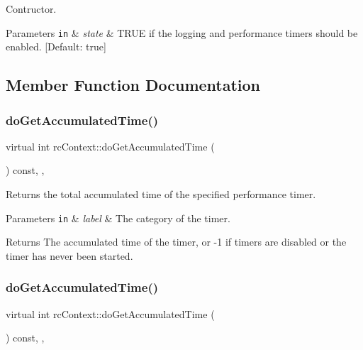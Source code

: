 Contructor. 
\begin{DoxyParams}[1]{Parameters}
\mbox{\tt in}  & {\em state} & T\+R\+UE if the logging and performance timers should be enabled. \mbox{[}Default\+: true\mbox{]} \\
\hline
\end{DoxyParams}


\subsection{Member Function Documentation}
\mbox{\label{classrcContext_aac5af865c567bd0e362cb6a98c65c860}} 
\subsubsection{\texorpdfstring{do\+Get\+Accumulated\+Time()}{doGetAccumulatedTime()}\hspace{0.1cm}{\footnotesize\ttfamily [1/2]}}
{\footnotesize\ttfamily virtual int rc\+Context\+::do\+Get\+Accumulated\+Time (\begin{DoxyParamCaption}\item[{const rc\+Timer\+Label}]{ }\end{DoxyParamCaption}) const\hspace{0.3cm}{\ttfamily [inline]}, {\ttfamily [protected]}, {\ttfamily [virtual]}}

Returns the total accumulated time of the specified performance timer. 
\begin{DoxyParams}[1]{Parameters}
\mbox{\tt in}  & {\em label} & The category of the timer. \\
\hline
\end{DoxyParams}
\begin{DoxyReturn}{Returns}
The accumulated time of the timer, or -\/1 if timers are disabled or the timer has never been started. 
\end{DoxyReturn}
\mbox{\label{classrcContext_aac5af865c567bd0e362cb6a98c65c860}} 
\subsubsection{\texorpdfstring{do\+Get\+Accumulated\+Time()}{doGetAccumulatedTime()}\hspace{0.1cm}{\footnotesize\ttfamily [2/2]}}
{\footnotesize\ttfamily virtual int rc\+Context\+::do\+Get\+Accumulated\+Time (\begin{DoxyParamCaption}\item[{const rc\+Timer\+Label}]{ }\end{DoxyParamCaption}) const\hspace{0.3cm}{\ttfamily [inline]}, {\ttfamily [protected]}, {\ttfamily [virtual]}}

